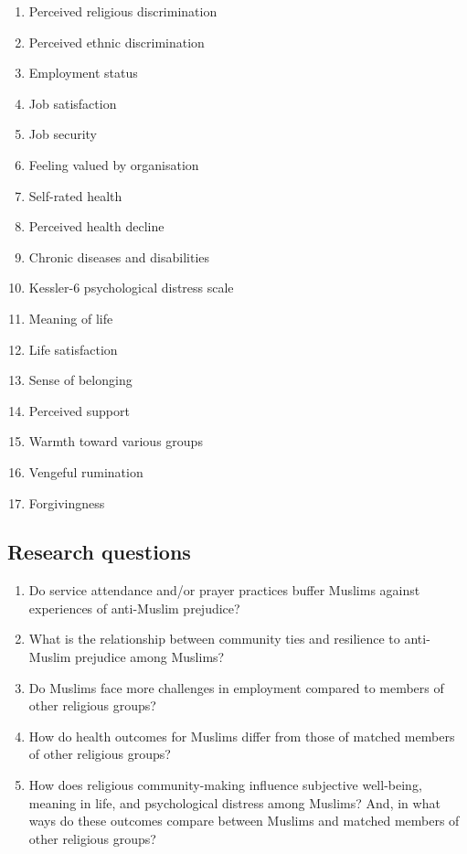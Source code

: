 \documentclass[
]{interact}
\providecommand{\tightlist}{%
  \setlength{\itemsep}{0pt}\setlength{\parskip}{0pt}}\usepackage{longtable,booktabs,array}
\begin{document}
\begin{enumerate}
\def\labelenumi{\arabic{enumi}.}
\tightlist
\item
  Perceived religious discrimination
\item
  Perceived ethnic discrimination
\item
  Employment status
\item
  Job satisfaction
\item
  Job security
\item
  Feeling valued by organisation
\item
  Self-rated health
\item
  Perceived health decline
\item
  Chronic diseases and disabilities
\item
  Kessler-6 psychological distress scale
\item
  Meaning of life
\item
  Life satisfaction
\item
  Sense of belonging
\item
  Perceived support
\item
  Warmth toward various groups
\item
  Vengeful rumination
\item
  Forgivingness
\end{enumerate}

\subsection{Research questions}\label{research-questions}

\begin{enumerate}
\def\labelenumi{\arabic{enumi}.}
\tightlist
\item
  Do service attendance and/or prayer practices buffer Muslims against
  experiences of anti-Muslim prejudice?
\item
  What is the relationship between community ties and resilience to
  anti-Muslim prejudice among Muslims?
\item
  Do Muslims face more challenges in employment compared to members of
  other religious groups?
\item
  How do health outcomes for Muslims differ from those of matched
  members of other religious groups?
\item
  How does religious community-making influence subjective well-being,
  meaning in life, and psychological distress among Muslims? And, in
  what ways do these outcomes compare between Muslims and matched
  members of other religious groups?
\end{enumerate}
\end{document}
